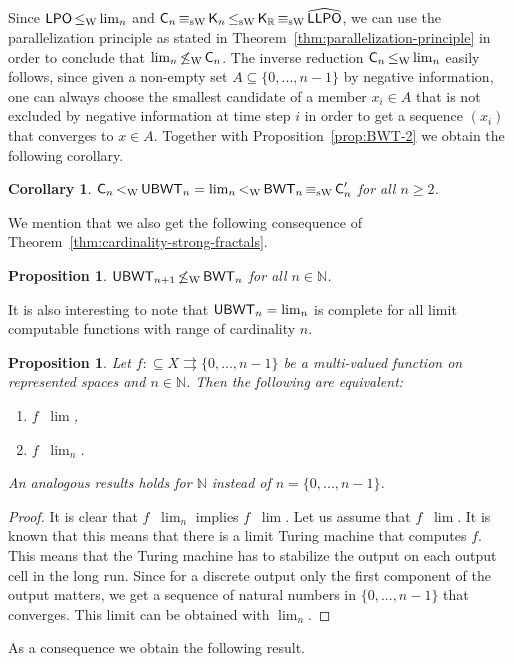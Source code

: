 \documentclass[a4paper]{amsart}
\def\IN{{\mathbb{N}}}
\def\IR{{\mathbb{R}}}
\def\In{\subseteq}
\def\mto{\rightrightarrows}
\def\LPO{\text{\rm\sffamily LPO}}
\def\LLPO{\text{\rm\sffamily LLPO}}
\def\BWT{\text{\rm\sffamily BWT}}
\def\C{\mbox{\rm\sffamily C}}
\def\LPO{\mbox{\rm\sffamily LPO}}
\def\LLPO{\mbox{\rm\sffamily LLPO}}
\def\UBWT{\text{\rm\sffamily UBWT}}
\def\K{\text{\rm\sffamily K}}
\def\leqW{\mathop{\leq_{\mathrm{W}}}}
\def\leqSW{\mathop{\leq_{\mathrm{sW}}}}
\def\equivSW{\mathop{\equiv_{\mathrm{sW}}}}
\def\nleqW{\mathop{\not\leq_{\mathrm{W}}}}
\def\lW{\mathop{<_{\mathrm{W}}}}
\newtheorem{proposition}[theorem]{Proposition}
\newtheorem{corollary}[theorem]{Corollary}
\theoremstyle{definition}
\begin{document}
Since $\LPO\leqW\lim_n$ and $\C_n\equivSW\K_n\leqSW\K_\IR\equivSW\widehat{\LLPO}$,
we can use the parallelization principle as stated in Theorem~\ref{thm:parallelization-principle}
in order to conclude that $\lim_n\nleqW\C_n$. 
The inverse reduction $\C_n\leqW\lim_n$ easily follows, since given a non-empty set $A\In\{0,...,n-1\}$
by negative information, one can always choose the smallest candidate of a member $x_i\in A$
that is not excluded by negative information at time step $i$ in order to get a sequence $(x_i)$ that converges to $x\in A$.
Together with Proposition~\ref{prop:BWT-2} we obtain the following corollary.


\begin{corollary}
$\C_n\lW\UBWT_n=\lim_n\lW\BWT_n\equivSW\C_n'$ for all $n\geq2$.
\end{corollary}

We mention that we also get the following consequence of Theorem~\ref{thm:cardinality-strong-fractals}.

\begin{proposition}
$\UBWT_{n+1}\nleqW\BWT_n$ for all $n\in\IN$.
\end{proposition}

It is also interesting to note that $\UBWT_n=\lim_n$ is complete
for all limit computable functions with range of cardinality $n$.

\begin{proposition}
\label{prop:lim-n}
Let $f:\In X\mto\{0,...,n-1\}$ be a multi-valued function on 
represented spaces and $n\in\IN$. Then the following are equivalent:
\begin{enumerate}
\item $f\leqW\lim$,
\item $f\leqSW\lim_n$. 
\end{enumerate}
An analogous results holds for $\IN$ instead of $n=\{0,...,n-1\}$.
\end{proposition}
\begin{proof}
It is clear that $f\leqSW\lim_n$ implies $f\leqW\lim$. Let us assume that $f\leqW\lim$.
It is known that this means that there is a limit Turing machine that computes $f$.
This means that the Turing machine has to stabilize the output on each output cell
in the long run. Since for a discrete output only the first component of the output
matters, we get a sequence of natural numbers in $\{0,...,n-1\}$ that converges.
This limit can be obtained with $\lim_n$.
\end{proof}

As a consequence we obtain the following result. 
\end{document}
